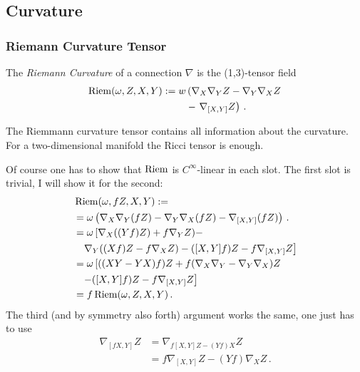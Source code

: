 \documentclass[11pt, a4paper, twocolumn]{article} %
\begin{document}
\subsection{Curvature}
\subsubsection{Riemann Curvature Tensor}
\begin{defn}
    The \textit{Riemann Curvature} of a connection $\nabla$ is the
    (1,3)-tensor field
    \begin{align}
        \nonumber \operatorname{Riem}(\omega, Z, X, Y) := w&\left( \nabla_X \nabla_Y Z - \nabla_Y\nabla_X Z \right.\\
        &-\left. \nabla_{[X,Y]}Z \right)\,.
    \end{align}
\end{defn}
\begin{note}
    The Riemmann curvature tensor contains all information about the curvature.
    For a two-dimensional manifold the Ricci tensor is enough.
\end{note}
\begin{note}
    Of course one has to show that $\operatorname{Riem}$ is $C^\infty$-linear in each slot. 
    The first slot is trivial, I will show it for the second:
    \begin{align*}
         &\operatorname{Riem}(\omega, fZ, X, Y) := \\ 
         &=\omega\left( \nabla_X \nabla_Y (fZ) - \nabla_Y\nabla_X (fZ) - \nabla_{[X,Y]}(fZ) \right)\,.\\
         &=\omega\left[ \nabla_X( (Yf)Z) + f\nabla_Y Z) - \right.\\
         &\phantom{=}\left.\nabla_Y( (Xf)Z - f\nabla_X Z) - ([X,Y]f)Z - f\nabla_{[X,Y]}Z\right]\\
         &= \omega\left[ ( (XY - YX) f )Z + f(\nabla_X\nabla_Y - \nabla_Y\nabla_X)Z\right.\\
         &\phantom{=} \left. - ([X,Y]f)Z - f\nabla_{[X,Y]}Z\right]\\
         &= f \operatorname{Riem}(\omega, Z, X, Y)\,.
     \end{align*}
     The third (and by symmetry also forth) argument works the same, one just has to use
     \begin{align}
         \nonumber\nabla_{[fX,Y]}Z &= \nabla_{f[X,Y]Z - (Yf)X}Z  \\
         &=f\nabla_{[X,Y]}Z - (Yf)\nabla_X Z\,.
     \end{align}
\end{note}
\end{document}

